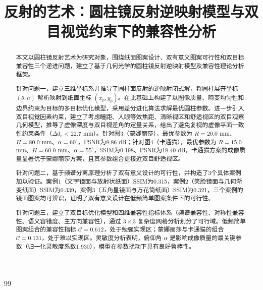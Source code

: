 \documentclass[withoutpreface,bwprint]{cumcmthesis}
\title{反射的艺术：圆柱镜反射逆映射模型与双目视觉约束下的兼容性分析}
\begin{document}
\maketitle

\begin{abstract}
本文以圆柱镜反射艺术为研究对象，围绕纸面图案设计、双有意义图案可行性和双目标兼容性三个递进问题，建立了基于几何光学的圆柱镜反射逆映射模型及兼容性理论分析框架。

针对问题一，建立三维坐标系并推导了圆柱面反射的逆映射闭式解，将圆柱展开坐标 $(\theta, h)$ 解析映射到纸面坐标 $(x_p, y_p)$。在此基础上构建了以图像质量、畸变均匀性和边界约束为目标的多目标优化模型，采用差分进化算法求解最优圆柱参数。进一步引入双目视觉因素约束，建立了考虑瞳距、人眼等效焦距、清晰视区和舒适视区的双目观察几何模型，推导了虚像深度与双目视差角的定量关系，给出了避免复视的虚像平面一致性约束条件（$\Delta d_v < 22.7$ mm）。针对图3（蒙娜丽莎），最优参数为 $R=20.0$ mm、$H=80.0$ mm、$\alpha=60^{\circ}$，PSNR为8.86 dB；针对图4（卡通猫），最优参数为 $R=15.0$ mm、$H=60.0$ mm、$\alpha=55^{\circ}$，SSIM为0.198、PSNR为18.40 dB，卡通猫方案的成像质量显著优于蒙娜丽莎方案，且其参数组合更接近双目舒适视区。

针对问题二，基于频谱分离原理分析了双有意义设计的可行性，并构造了3个具体案例加以验证。案例1（文字镜面与放射状纸面）SSIM为0.315，案例2（笑脸镜面与几何渐变纸面）SSIM为0.339，案例3（五角星镜面与万花筒纸面）SSIM为0.321，三个案例的镜面图案均可辨识，证明了双有意义设计在低频简单图案条件下的可行性。

针对问题三，建立了双目标优化模型和四维兼容性指标体系（频谱兼容性、对称性兼容性、语义容错度、主方向兼容性），通过 $3\times3$ 复杂度网格分析划分了可行域。低频简单图案组合的兼容性指标 $\mathcal{C}=0.612$，处于勉强实现区；蒙娜丽莎与卡通猫的组合 $\mathcal{C}=0.131$，处于难以实现区。灵敏度分析表明，俯仰角 $\alpha$ 是影响成像质量的最关键参数（归一化灵敏度系数1.930），模型在参数扰动下具有良好鲁棒性。

\end{abstract}

\tableofcontents
\newpage










\begin{thebibliography}{99}

\end{thebibliography}

\begin{appendices}

\end{appendices}
\end{document}
